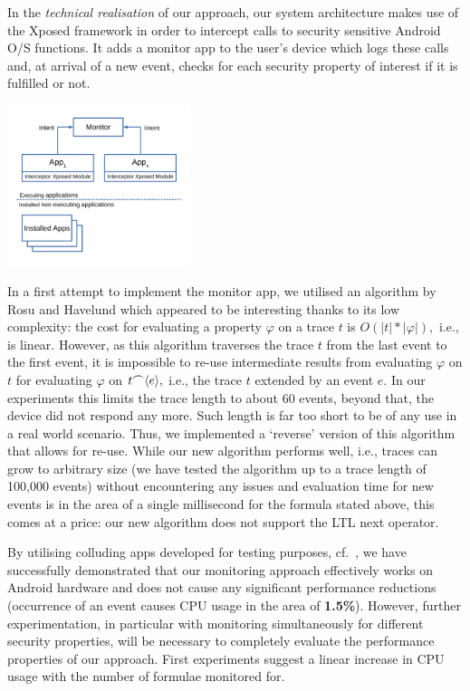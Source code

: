 \documentclass[runningheads]{llncs}
\begin{document}
In the \emph{technical realisation} of our approach, our system
architecture makes use of the Xposed framework \cite{Xposed}
in order to intercept calls to security sensitive Android
O/S functions. It adds a monitor app to the user's device which logs
these calls and, at arrival of a new event, checks for each security
property of interest if it is fulfilled or not.

\begin{center}
\includegraphics[width=0.4\textwidth]{HighLevelArchitecture2.pdf}
\end{center}

In a first attempt to implement the monitor app, we utilised an
algorithm by Rosu and Havelund \cite{RosuHavelund} which appeared to
be interesting thanks to its low complexity: the cost for evaluating a
property $\varphi$ on a trace $t$ is $O(|t| * |\varphi|),$ i.e., is
linear. However, as this algorithm traverses the trace $t$ from the
last event to the first event, it is impossible to re-use intermediate
results from evaluating $\varphi$ on $t$ for evaluating $\varphi$ on
$t {\mathbin{\raise 0.8ex\hbox{$\frown$}}} \langle e \rangle,$ i.e.,
the trace $t$ extended by an event $e.$ In our experiments this limits
the trace length to about 60 events, beyond that, the device did not
respond any more. Such length is far too short to be of any use in a
real world scenario. Thus, we implemented a `reverse' version of this
algorithm that allows for re-use. While our new algorithm performs
well, i.e., traces can grow to arbitrary size (we have tested the
algorithm up to a trace length of 100,000 events) without
encountering any issues and evaluation time for new events is in the
area of a single millisecond for the formula stated above, this comes at a
price: our new algorithm does not support the LTL next operator.

By utilising colluding apps developed for testing purposes,
cf.\ \cite{collusion17}, we have successfully demonstrated that our
monitoring approach effectively works on Android hardware and does not
cause any significant performance reductions (occurrence of an event
causes CPU usage in the area of {\bf 1.5\%}). However, further
experimentation, in particular with monitoring simultaneously for
different security properties, will be necessary to completely
evaluate the performance properties of our approach. First experiments
suggest a linear increase in CPU usage with the number of formulae
monitored for.




\end{document}

